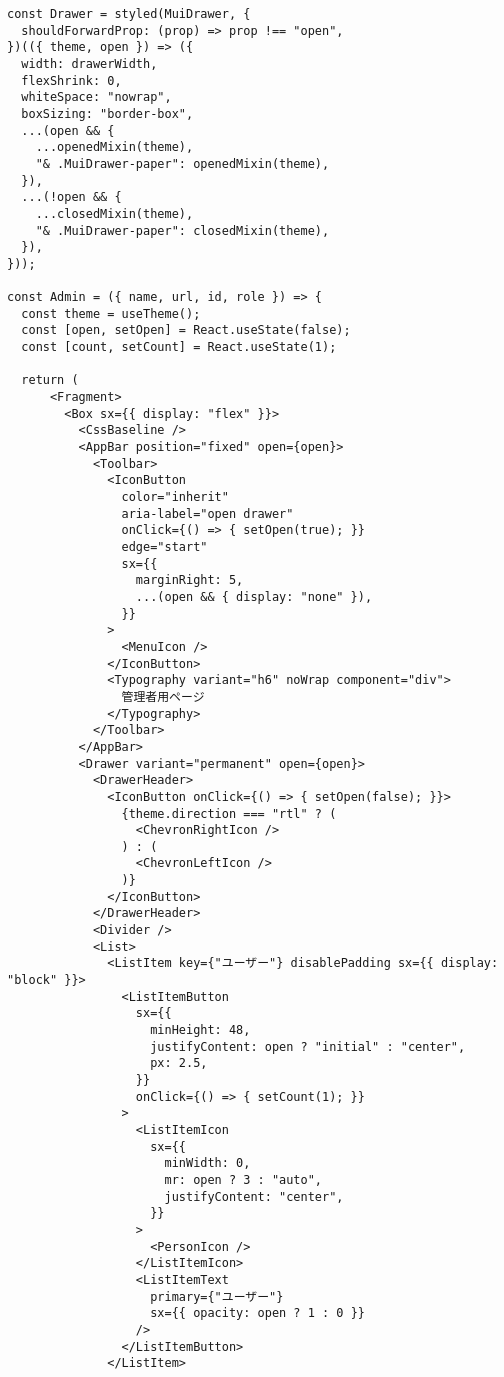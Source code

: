 \begin{verbatim}
const Drawer = styled(MuiDrawer, {
  shouldForwardProp: (prop) => prop !== "open",
})(({ theme, open }) => ({
  width: drawerWidth,
  flexShrink: 0,
  whiteSpace: "nowrap",
  boxSizing: "border-box",
  ...(open && {
    ...openedMixin(theme),
    "& .MuiDrawer-paper": openedMixin(theme),
  }),
  ...(!open && {
    ...closedMixin(theme),
    "& .MuiDrawer-paper": closedMixin(theme),
  }),
}));

const Admin = ({ name, url, id, role }) => {
  const theme = useTheme();
  const [open, setOpen] = React.useState(false);
  const [count, setCount] = React.useState(1);

  return (
      <Fragment>
        <Box sx={{ display: "flex" }}>
          <CssBaseline />
          <AppBar position="fixed" open={open}>
            <Toolbar>
              <IconButton
                color="inherit"
                aria-label="open drawer"
                onClick={() => { setOpen(true); }}
                edge="start"
                sx={{
                  marginRight: 5,
                  ...(open && { display: "none" }),
                }}
              >
                <MenuIcon />
              </IconButton>
              <Typography variant="h6" noWrap component="div">
                管理者用ページ
              </Typography>
            </Toolbar>
          </AppBar>
          <Drawer variant="permanent" open={open}>
            <DrawerHeader>
              <IconButton onClick={() => { setOpen(false); }}>
                {theme.direction === "rtl" ? (
                  <ChevronRightIcon />
                ) : (
                  <ChevronLeftIcon />
                )}
              </IconButton>
            </DrawerHeader>
            <Divider />
            <List>
              <ListItem key={"ユーザー"} disablePadding sx={{ display: "block" }}>
                <ListItemButton
                  sx={{
                    minHeight: 48,
                    justifyContent: open ? "initial" : "center",
                    px: 2.5,
                  }}
                  onClick={() => { setCount(1); }}
                >
                  <ListItemIcon
                    sx={{
                      minWidth: 0,
                      mr: open ? 3 : "auto",
                      justifyContent: "center",
                    }}
                  >
                    <PersonIcon />
                  </ListItemIcon>
                  <ListItemText
                    primary={"ユーザー"}
                    sx={{ opacity: open ? 1 : 0 }}
                  />
                </ListItemButton>
              </ListItem>

\end{verbatim}
